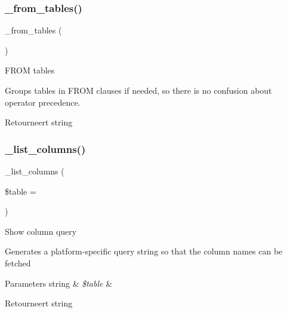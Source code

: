 \subsubsection{\texorpdfstring{\_from\_tables()}{\_from\_tables()}}
{\footnotesize\ttfamily \+\_\+from\+\_\+tables (\begin{DoxyParamCaption}{ }\end{DoxyParamCaption})\hspace{0.3cm}{\ttfamily [protected]}}

F\+R\+OM tables

Groups tables in F\+R\+OM clauses if needed, so there is no confusion about operator precedence.

\begin{DoxyReturn}{Retourneert}
string 
\end{DoxyReturn}
\mbox{\label{class_c_i___d_b__mysqli__driver_a7ccb7f9c301fe7f0a9db701254142b63}} 
\subsubsection{\texorpdfstring{\_list\_columns()}{\_list\_columns()}}
{\footnotesize\ttfamily \+\_\+list\+\_\+columns (\begin{DoxyParamCaption}\item[{}]{\$table = {\ttfamily \textquotesingle{}\textquotesingle{}} }\end{DoxyParamCaption})\hspace{0.3cm}{\ttfamily [protected]}}

Show column query

Generates a platform-\/specific query string so that the column names can be fetched


\begin{DoxyParams}[1]{Parameters}
string & {\em \$table} & \\
\hline
\end{DoxyParams}
\begin{DoxyReturn}{Retourneert}
string 
\end{DoxyReturn}
\mbox{\label{class_c_i___d_b__mysqli__driver_a435c0f3ce54fe7daa178baa8532ebd54}} 
